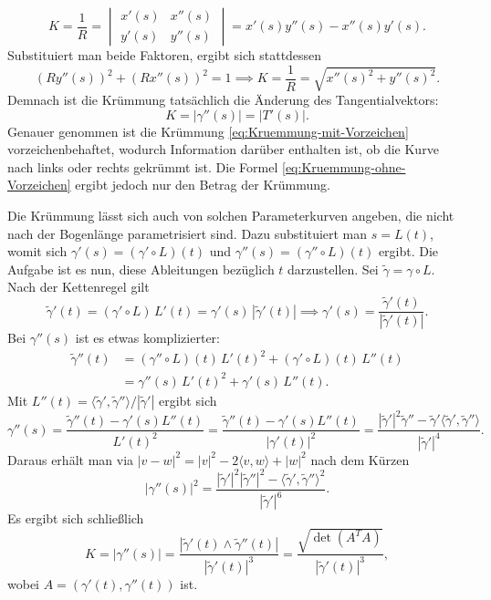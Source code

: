 \begin{equation}\label{eq:Kruemmung-mit-Vorzeichen}
K = \frac{1}{R} =
\begin{vmatrix}
x'(s) & x''(s)\\
y'(s) & y''(s)
\end{vmatrix}
= x'(s)y''(s)-x''(s)y'(s).
\end{equation}
Substituiert man beide Faktoren, ergibt sich stattdessen
\begin{equation}
(Ry''(s))^2+(Rx''(s))^2 = 1
\implies K = \frac{1}{R} = \sqrt{x''(s)^2+y''(s)^2}.
\end{equation}
Demnach ist die Krümmung tatsächlich die Änderung des
Tangentialvektors:
\begin{equation}\label{eq:Kruemmung-ohne-Vorzeichen}
K = |\gamma''(s)| = |T'(s)|.
\end{equation}
Genauer genommen ist die Krümmung \eqref{eq:Kruemmung-mit-Vorzeichen}
vorzeichenbehaftet, wodurch Information darüber enthalten ist, ob
die Kurve nach links oder rechts gekrümmt ist. Die Formel
\eqref{eq:Kruemmung-ohne-Vorzeichen} ergibt jedoch nur den Betrag
der Krümmung.

Die Krümmung lässt sich auch von solchen Parameterkurven angeben,
die nicht nach der Bogenlänge parametrisiert sind. Dazu substituiert
man $s=L(t)$, womit sich $\gamma'(s) = (\gamma'\circ L)(t)$ und
$\gamma''(s)=(\gamma''\circ L)(t)$ ergibt. Die Aufgabe ist es nun, diese
Ableitungen bezüglich $t$ darzustellen. Sei $\tilde\gamma = \gamma\circ L$.
Nach der Kettenregel gilt%
\begin{equation}
\tilde\gamma'(t) = (\gamma'\circ L)\,L'(t) = \gamma'(s)\,|\tilde\gamma'(t)|
\implies \gamma'(s) = \frac{\tilde\gamma'(t)}{|\tilde\gamma'(t)|}.
\end{equation}
Bei $\gamma''(s)$ ist es etwas komplizierter:
\begin{align}
\tilde\gamma''(t)
&= (\gamma''{\circ}L)(t)\,L'(t)^2+(\gamma'{\circ}L)(t)\,L''(t)\\
&= \gamma''(s)\,L'(t)^2+\gamma'(s)\,L''(t).
\end{align}
Mit $L''(t)=\langle\tilde\gamma',\tilde\gamma''\rangle/|\tilde\gamma'|$
ergibt sich
\begin{equation}
\gamma''(s) = \frac{\tilde\gamma''(t)-\gamma'(s)L''(t)}{L'(t)^2}
= \frac{\tilde\gamma''(t)-\gamma'(s)L''(t)}{|\gamma'(t)|^2}
= \frac{
|\tilde\gamma'|^2\tilde\gamma''
-\tilde\gamma'\langle\tilde\gamma',\tilde\gamma''\rangle
}{|\tilde\gamma'|^4}.
\end{equation}
Daraus erhält man via $|v-w|^2 = |v|^2-2\langle v,w\rangle+|w|^2$ nach
dem Kürzen
\begin{equation}
|\gamma''(s)|^2 = \frac{
|\tilde\gamma'|^2|\tilde\gamma''|^2
-\langle\tilde\gamma',\tilde\gamma''\rangle^2
}{|\tilde\gamma'|^6}.
\end{equation}
Es ergibt sich schließlich
\begin{equation}\label{eq:Kruemmung-t}
K = |\gamma''(s)| = \frac{|\tilde\gamma'(t)\wedge\tilde\gamma''(t)|}{|\tilde\gamma'(t)|^3}
= \frac{\sqrt{\det(A^T A)}}{|\tilde\gamma'(t)|^3},
\end{equation}
wobei $A=(\gamma'(t),\gamma''(t))$ ist.

